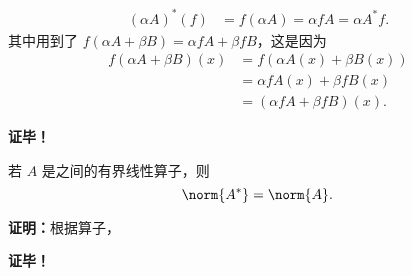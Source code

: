 \begin{equation}
\begin{aligned}
(\alpha A)^*(f)&=f(\alpha A)=\alpha fA=\alpha A^*f.
\end{aligned}~
\end{equation}
其中用到了 $f(\alpha A+\beta B)=\alpha fA+\beta fB$，这是因为
\begin{equation}
\begin{aligned}
f(\alpha A+\beta B)(x)&=f(\alpha A(x)+\beta B(x))\\
&=\alpha fA(x)+\beta fB(x)\\
&=(\alpha fA+\beta fB)(x).
\end{aligned}~
\end{equation}

\textbf{证毕！}



\begin{theorem}{}
若 $A$ 是之间的有界线性算子，则
\begin{equation}
\norm{A^*}=\norm{A}.~
\end{equation}

\end{theorem}

\textbf{证明：}根据算子，
\begin{equation}

\end{equation}



\textbf{证毕！}



